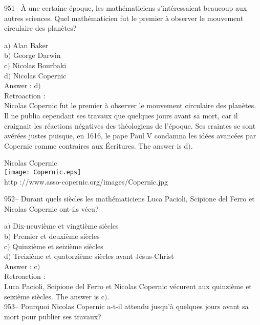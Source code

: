 ﻿\documentclass[letterpaper, 12pt]{article}
\begin{document}
951-- \`A une certaine \'epoque, les math\'ematiciens
s'int\'eressaient beaucoup aux autres sciences. Quel math\'ematicien
fut le premier \`a observer le mouvement circulaire des plan\`etes?

a$)$ Alan Baker \\
b$)$ George Darwin \\
c$)$ Nicolas Bourbaki  \\
d$)$ Nicolas Copernic \\

Answer : d$)$\\

Retroaction : \\
Nicolas Copernic fut le premier \`a observer le mouvement circulaire
des plan\`etes. Il ne publia cependant ses travaux que quelques
jours avant sa mort, car il craignait les r\'eactions n\'egatives
des th\'eologiens de l'\'epoque. Ses craintes se sont av\'er\'ees
justes puisque, en 1616, le pape Paul V condamna les id\'ees
avanc\'ees par Copernic comme \og contraires aux
\'Ecritures\fg . The answer is d$)$.\\

        \begin{center}
        Nicolas Copernic\\
    \texttt{[image: Copernic.eps]}\\
        {\footnotesize http ://www.asso-copernic.org/images/Copernic.jpg}
    \end{center}

952-- Durant quels si\`ecles les math\'ematiciens Luca Pacioli,
Scipione del Ferro et Nicolas Copernic ont-ils v\'ecu?

a$)$ Dix-neuvi\`eme et vingti\`eme si\`ecles \\
b$)$ Premier et deuxi\`eme si\`ecles \\
c$)$ Quinzi\`eme et seizi\`eme si\`ecles  \\
d$)$ Treizi\`eme et quatorzi\`eme si\`ecles avant J\'esus-Christ\\

Answer : c$)$\\

Retroaction : \\
Luca Pacioli, Scipione del Ferro et Nicolas Copernic v\'ecurent aux
quinzi\`eme et seizi\`eme si\`ecles. The answer is c$)$.\\

953-- Pourquoi Nicolas Copernic a-t-il attendu jusqu'\`a quelques
jours avant sa mort pour publier ses travaux?
\end{document}
